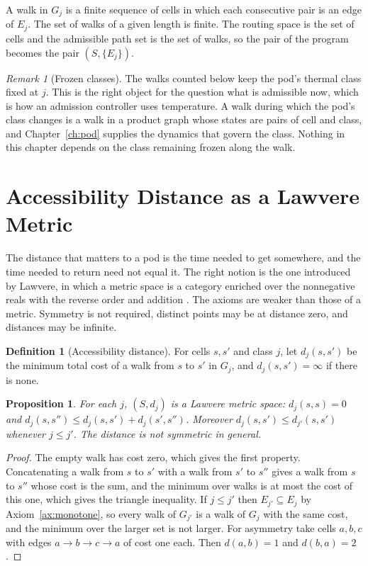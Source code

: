 \documentclass[11pt,openany]{book}
\theoremstyle{plain}
\newtheorem{proposition}[theorem]{Proposition}
\theoremstyle{definition}
\newtheorem{definition}[theorem]{Definition}
\theoremstyle{remark}
\newtheorem{remark}[theorem]{Remark}
\begin{document}
A walk in $G_j$ is a finite sequence of cells in which each consecutive pair is an edge of $E_j$. The set of walks of a given length is finite. The routing space is the set of cells and the admissible path set is the set of walks, so the pair of the program becomes the pair $(S,\{E_j\})$.

\begin{remark}[Frozen classes]
The walks counted below keep the pod's thermal class fixed at $j$. This is the right object for the question what is admissible now, which is how an admission controller uses temperature. A walk during which the pod's class changes is a walk in a product graph whose states are pairs of cell and class, and Chapter~\ref{ch:pod} supplies the dynamics that govern the class. Nothing in this chapter depends on the class remaining frozen along the walk.
\end{remark}

\section{Accessibility Distance as a Lawvere Metric}

The distance that matters to a pod is the time needed to get somewhere, and the time needed to return need not equal it. The right notion is the one introduced by Lawvere, in which a metric space is a category enriched over the nonnegative reals with the reverse order and addition \cite{lawvere}. The axioms are weaker than those of a metric. Symmetry is not required, distinct points may be at distance zero, and distances may be infinite.

\begin{definition}[Accessibility distance]
For cells $s,s'$ and class $j$, let $d_j(s,s')$ be the minimum total cost of a walk from $s$ to $s'$ in $G_j$, and $d_j(s,s')=\infty$ if there is none.
\end{definition}

\begin{proposition}
\label{prop:lawvere}
For each $j$, $(S,d_j)$ is a Lawvere metric space: $d_j(s,s)=0$ and $d_j(s,s'')\le d_j(s,s')+d_j(s',s'')$. Moreover $d_j(s,s')\le d_{j'}(s,s')$ whenever $j\le j'$. The distance is not symmetric in general.
\end{proposition}
\begin{proof}
The empty walk has cost zero, which gives the first property. Concatenating a walk from $s$ to $s'$ with a walk from $s'$ to $s''$ gives a walk from $s$ to $s''$ whose cost is the sum, and the minimum over walks is at most the cost of this one, which gives the triangle inequality. If $j\le j'$ then $E_{j'}\subseteq E_j$ by Axiom~\ref{ax:monotone}, so every walk of $G_{j'}$ is a walk of $G_j$ with the same cost, and the minimum over the larger set is not larger. For asymmetry take cells $a,b,c$ with edges $a\to b\to c\to a$ of cost one each. Then $d(a,b)=1$ and $d(b,a)=2$.
\end{proof}
\end{document}
